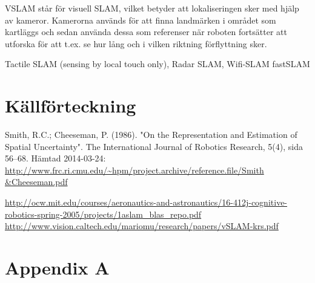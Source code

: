 \documentclass[a4paper,12pt,fleqn]{article} \usepackage{fixltx2e}
\begin{document}
VSLAM står för visuell SLAM, vilket betyder att lokaliseringen sker med hjälp av kameror. Kamerorna används
för att finna landmärken i området som kartläggs och sedan använda dessa som referenser när roboten fortsätter att utforska
för att t.ex. se hur lång och i vilken riktning förflyttning sker.

 
Tactile SLAM (sensing by local touch only), Radar
SLAM, 
Wifi-SLAM 
fastSLAM

\newpage \section{Källförteckning} Smith, R.C.; Cheeseman, P. (1986).
"On the Representation and Estimation of Spatial Uncertainty". The
International Journal of Robotics Research, 5(4), sida 56–68. Hämtad
2014-03-24:
\url{http://www.frc.ri.cmu.edu/~hpm/project.archive/reference.file/Smith
&Cheeseman.pdf}

\url{http://ocw.mit.edu/courses/aeronautics-and-astronautics/16-412j-cognitive-robotics-spring-2005/projects/1aslam_blas_repo.pdf}
\url{http://www.vision.caltech.edu/mariomu/research/papers/vSLAM-krs.pdf}

% 
\newpage \appendix \pagestyle{empty}
 \section{Appendix A}
\end{document}
